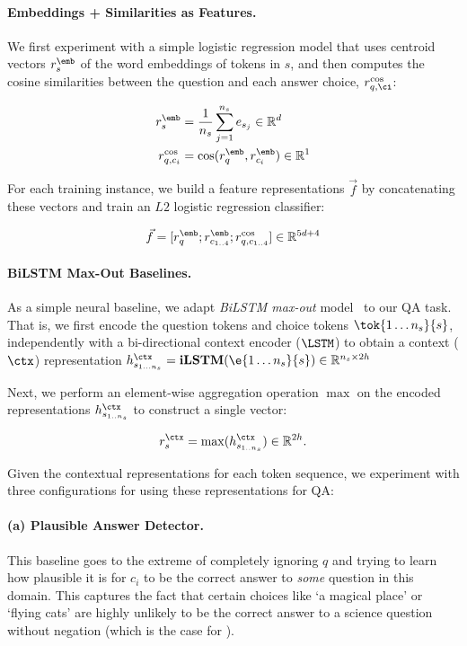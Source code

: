 \paragraph{Embeddings + Similarities as Features.} We first experiment with a simple logistic regression model \cite{SemEval2016:task3:SemanticZ,mihaylovfrank:2016,mihaylovfrank:2017} that uses centroid vectors $r^{\emb}_s$ of the word embeddings of tokens in $s$, and then computes the cosine similarities between the question and each answer choice, $r^{\cos}_{q, \ci}$:

\begin{align*}
r^{\emb}_{s} & = \frac{1}{n_s} \sum_{j=1}^{n_s} e_{s_j} \in \mathbb{R}^d\\
r^{\cos}_{q,c_{i}} &= \cos(r^{\emb}_{q}, r^{\emb}_{c_i}) \in \mathbb{R}^1
\end{align*}

For each training instance, we build a feature representations $\vec{f}$ by concatenating these vectors and train an $L2$ logistic regression classifier:

\begin{align*}
\vec{f} = [r^{\emb}_{q} ; r^{\emb}_{c_{1..4}} ; r^{\cos}_{q,c_{1..4}}] \in \mathbb{R}^{5d+4}
\end{align*}

\paragraph{BiLSTM Max-Out Baselines.} As a simple neural baseline, we adapt \textit{BiLSTM max-out} model~\citep{Conneau2017} to our QA task. That is, we first encode the question tokens and choice tokens $\tok{1\ldots n_s}{s}$, independently with a bi-directional context encoder ($\LSTM$) to obtain a context ($\ctx$) representation 
$h^{\ctx}_{s_{1\ldots n_s}} = \mathbf{iLSTM}(\e{1\ldots n_s}{s}) \in \mathbb{R}^{n_s \times 2h}$

Next, we perform an element-wise aggregation operation $\max$ on the encoded representations $h^{\ctx}_{s_{1..n_s}}$ to construct a single vector:

\begin{align}
\label{eq:max-h}
r^{\ctx}_{s} = \max(h^{\ctx}_{s_{1..n_s}}) \in \mathbb{R}^{2h}.
\end{align}

Given the contextual representations for each token sequence, we experiment with three configurations for using these representations for QA:

\paragraph{(a) Plausible Answer Detector.} This baseline goes to the extreme of completely ignoring $q$ and trying to learn how plausible it is for $c_i$ to be the correct answer to \emph {some} question in this domain. This captures the fact that certain choices like `a magical place' or `flying cats' are highly unlikely to be the correct answer to a science question without negation (which is the case for \obqa).

